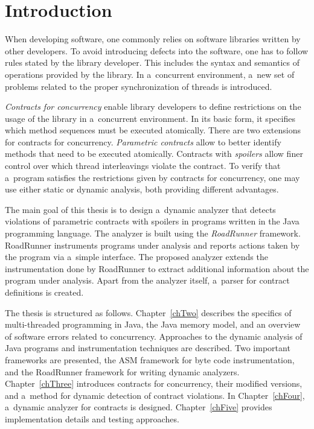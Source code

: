 
\chapter{Introduction}

When developing software, one commonly relies on software libraries written by
other developers. To avoid introducing defects into the software, one has to
follow rules stated by the library developer. This includes the syntax and
semantics of operations provided by the library. In a~concurrent environment,
a~new set of problems related to the proper synchronization of threads is
introduced.

\emph{Contracts for concurrency} enable library developers to define
restrictions on the usage of the library in a~concurrent environment. In its
basic form, it specifies which method sequences must be executed atomically.
There are two extensions for contracts for concurrency. \emph{Parametric
contracts} allow to better identify methods that need to be executed atomically.
Contracts with \emph{spoilers} allow finer control over which thread
interleavings violate the contract. To verify that a~program satisfies the
restrictions given by contracts for concurrency, one may use either static or
dynamic analysis, both providing different advantages.

The main goal of this thesis is to design a~dynamic analyzer that detects
violations of parametric contracts with spoilers in programs written in the Java
programming language. The analyzer is built using the \emph{RoadRunner}
framework. RoadRunner instruments programs under analysis and reports actions
taken by the program via a~simple interface. The proposed analyzer extends the
instrumentation done by RoadRunner to extract additional information about the
program under analysis. Apart from the analyzer itself, a~parser for contract
definitions is created.


The thesis is structured as follows. Chapter~\ref{chTwo} describes the specifics
of multi-threaded programming in Java, the Java memory model, and an overview of
software errors related to concurrency. Approaches to the dynamic analysis of
Java programs and instrumentation techniques are described. Two important
frameworks are presented, the ASM framework for byte code instrumentation, and
the RoadRunner framework for writing dynamic analyzers. Chapter~\ref{chThree}
introduces contracts for concurrency, their modified versions, and a~method for
dynamic detection of contract violations. In Chapter~\ref{chFour}, a~dynamic
analyzer for contracts is designed. Chapter~\ref{chFive} provides implementation
details and testing approaches.



